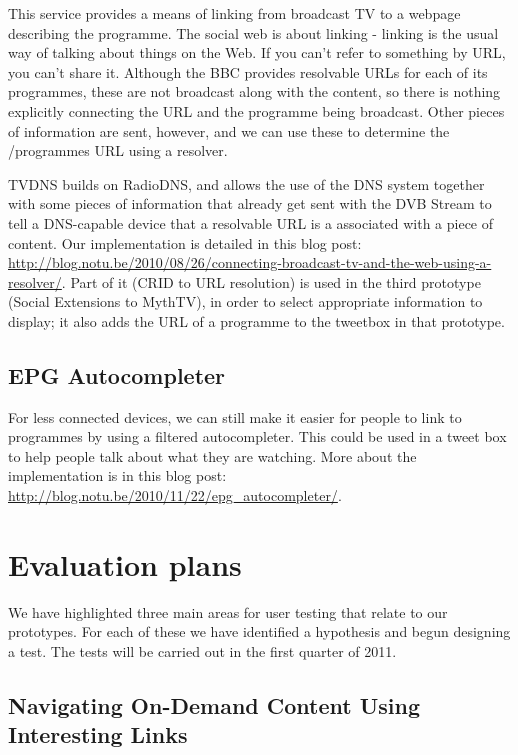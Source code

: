 \documentclass{notube}
\begin{document}
This service provides a means of linking from broadcast TV to a webpage describing the programme. The social web is about linking - linking is the usual way of talking about things on the Web. If you can't refer to something by URL, you can't share it.  Although the BBC provides resolvable URLs for each of its programmes, these are not broadcast along with the content, so there is nothing explicitly connecting the URL and the programme being broadcast. Other pieces of information are sent, however, and we can use these to determine the /programmes URL using a resolver.

TVDNS builds on RadioDNS, and allows the use of the DNS system together with some pieces of information that already get sent with the DVB Stream to tell a DNS-capable device that a resolvable URL is a associated with a piece of content. Our implementation is detailed in this blog post: \url{http://blog.notu.be/2010/08/26/connecting-broadcast-tv-and-the-web-using-a-resolver/}. Part of it (CRID  to URL resolution) is used in the third prototype (Social Extensions to MythTV), in order to select appropriate information to display; it also adds the URL of a programme to the tweetbox in that prototype.

\section{EPG Autocompleter}

For less connected devices, we can still make it easier for people to link to programmes by using a filtered autocompleter. This could be used in a tweet box to help people talk about what they are watching. More about the implementation is in this blog post:  \url{http://blog.notu.be/2010/11/22/epg_autocompleter/}.


\chapter{Evaluation plans}

We have highlighted three main areas for user testing that relate to our prototypes. For each of these we have identified a hypothesis and begun designing a test. The tests will be carried out in the first quarter of 2011.

\section{Navigating On-Demand Content Using Interesting Links}
\end{document}
